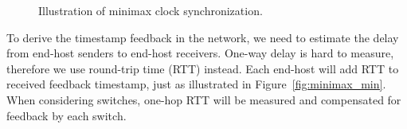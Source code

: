 \begin{figure}[t]
\centering

\caption{Illustration of minimax clock synchronization.}
\label{fig:minimax}
\vspace{-1.2em}
\end{figure}

To derive the timestamp feedback in the network, we need to estimate the delay from end-host senders to end-host receivers.
One-way delay is hard to measure, therefore we use round-trip time (RTT) instead.
Each end-host will add RTT to received feedback timestamp, just as illustrated in Figure~\ref{fig:minimax_min}.
When considering switches, one-hop RTT will be measured and compensated for feedback by each switch.

